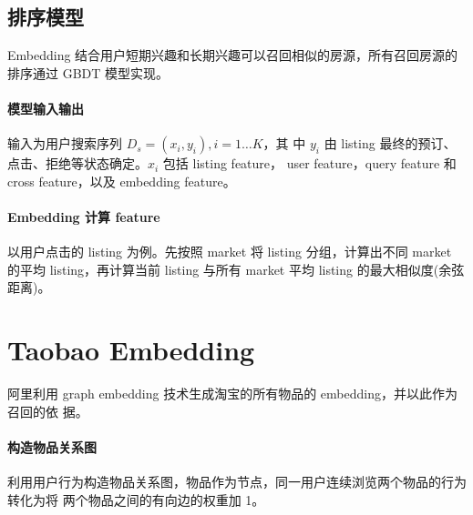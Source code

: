 \subsection{排序模型}
Embedding 结合用户短期兴趣和长期兴趣可以召回相似的房源，所有召回房源的排序通过
GBDT 模型实现。

\paragraph{模型输入输出} 输入为用户搜索序列 $D_s = (x_i, y_i), i=1 \ldots K$，其
中 $y_i$ 由 listing 最终的预订、点击、拒绝等状态确定。$x_i$ 包括 listing feature，
user feature，query feature 和 cross feature，以及 embedding feature。

\paragraph{Embedding 计算 feature} 以用户点击的 listing 为例。先按照 market 将
listing 分组，计算出不同 market 的平均 listing，再计算当前 listing 与所有 market
平均 listing 的最大相似度(余弦距离)。

\section{Taobao Embedding}
阿里利用 graph embedding 技术生成淘宝的所有物品的 embedding，并以此作为召回的依
据。

\paragraph{构造物品关系图}
利用用户行为构造物品关系图，物品作为节点，同一用户连续浏览两个物品的行为转化为将
两个物品之间的有向边的权重加 1。

